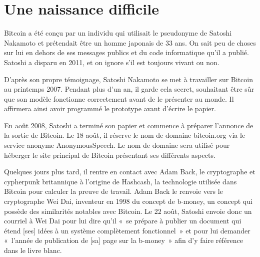 \section{Une naissance difficile} 

Bitcoin a été conçu par un individu qui utilisait le pseudonyme de Satoshi Nakamoto et prétendait être un homme japonais de 33 ans. On sait peu de choses sur lui en dehors de ses messages publics et du code informatique qu'il a publié. Satoshi a disparu en 2011, et on ignore s'il est toujours vivant ou non. 

D'après son propre témoignage, Satoshi Nakamoto se met à travailler sur Bitcoin au printemps 2007. Pendant plus d'un an, il garde cela secret, souhaitant être sûr que son modèle fonctionne correctement avant de le présenter au monde. Il affirmera ainsi avoir programmé le prototype avant d'écrire le papier.

En août 2008, Satoshi a terminé son papier et commence à préparer l'annonce de la sortie de Bitcoin. Le 18 août, il réserve le nom de domaine bitcoin.org via le service anonyme AnonymousSpeech. Le nom de domaine sera utilisé pour héberger le site principal de Bitcoin présentant ses différents aspects.

Quelques jours plus tard, il rentre en contact avec Adam Back, le cryptographe et cypherpunk britannique à l'origine de Hashcash, la technologie utilisée dans Bitcoin pour calculer la preuve de travail. Adam Back le renvoie vers le cryptographe Wei Dai, inventeur en 1998 du concept de b-money, un concept qui possède des similarités notables avec Bitcoin. Le 22 août, Satoshi envoie donc un courriel à Wei Dai pour lui dire qu'il «~se prépare à publier un document qui étend [ses] idées à un système complètement fonctionnel~» et pour lui demander «~l'année de publication de [sa] page sur la b-money~» afin d'y faire référence dans le livre blanc.

